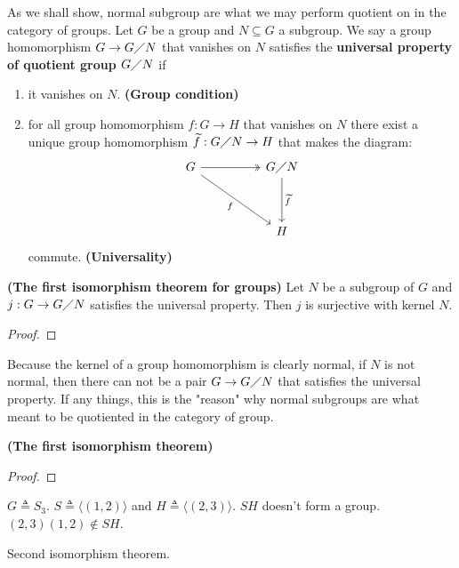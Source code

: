 \documentclass{report}
\begin{document}
As we shall show, normal subgroup are what we may perform quotient on in the category of groups. Let $G$ be a group and $N\subseteq  G$ a subgroup. We say a group homomorphism $G \rightarrow   G\diagup N$ that vanishes on $N$ satisfies the \textbf{universal property of quotient group $G\diagup N$} if 
\begin{enumerate}[label=(\roman*)]
  \item it vanishes on $N$. \textbf{(Group condition)}
  \item for all group homomorphism $f:G\rightarrow H$ that vanishes on $N$ there exist a unique group homomorphism $\widetilde{f} :G\diagup N\rightarrow H$ that makes the diagram: 
\[\begin{tikzcd}
	G && {G\quotient N } \\
	\\
	&& H 
	\arrow[two heads, from=1-1, to=1-3]
	\arrow["f"', from=1-1, to=3-3]
	\arrow["\tilde{f} ", from=1-3, to=3-3]
\end{tikzcd}\]
commute. \textbf{(Universality)}
\end{enumerate}




\begin{theorem}
\textbf{(The first isomorphism theorem for groups)} Let $N$ be a subgroup of  $G$ and $j:G \rightarrow G\diagup N$ satisfies the universal property. Then $j$ is surjective with kernel  $N$.\end{theorem}
\begin{proof}

\end{proof}
Because the kernel of a group homomorphism is clearly normal, if $N$ is not normal, then there can not be a pair $G\rightarrow G\diagup N$ that satisfies the universal property.  If any things, this is the "reason" why normal subgroups are what meant to be quotiented in the category of group. 
\begin{corollary}
\textbf{(The first isomorphism theorem)} 
\end{corollary}
\begin{proof}

\end{proof}


\begin{example}
$G\triangleq S_3$. $S\triangleq  \langle (1,2)\rangle $ and $H\triangleq \langle (2,3)\rangle $. $SH$ doesn't form a group. $(2,3)(1,2)\not \in SH$. 
\end{example}
Second isomorphism theorem. 
\end{document}
